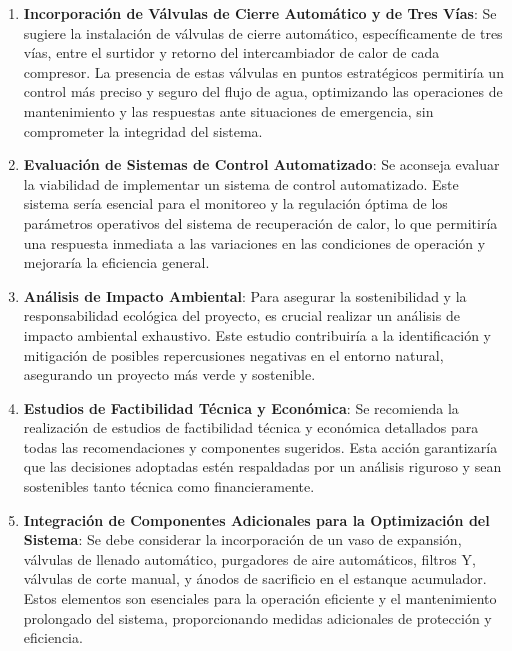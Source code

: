 \documentclass[11pt,a4paper]{article}  %
\begin{document}
\begin{enumerate}
  \item \textbf{Incorporación de Válvulas de Cierre Automático y de Tres Vías}: Se sugiere la instalación de válvulas de cierre automático, específicamente de tres vías, entre el surtidor y retorno del intercambiador de calor de cada compresor. La presencia de estas válvulas en puntos estratégicos permitiría un control más preciso y seguro del flujo de agua, optimizando las operaciones de mantenimiento y las respuestas ante situaciones de emergencia, sin comprometer la integridad del sistema.

\item \textbf{Evaluación de Sistemas de Control Automatizado}: Se aconseja evaluar la viabilidad de implementar un sistema de control automatizado. Este sistema sería esencial para el monitoreo y la regulación óptima de los parámetros operativos del sistema de recuperación de calor, lo que permitiría una respuesta inmediata a las variaciones en las condiciones de operación y mejoraría la eficiencia general.

\item \textbf{Análisis de Impacto Ambiental}: Para asegurar la sostenibilidad y la responsabilidad ecológica del proyecto, es crucial realizar un análisis de impacto ambiental exhaustivo. Este estudio contribuiría a la identificación y mitigación de posibles repercusiones negativas en el entorno natural, asegurando un proyecto más verde y sostenible.

\item \textbf{Estudios de Factibilidad Técnica y Económica}: Se recomienda la realización de estudios de factibilidad técnica y económica detallados para todas las recomendaciones y componentes sugeridos. Esta acción garantizaría que las decisiones adoptadas estén respaldadas por un análisis riguroso y sean sostenibles tanto técnica como financieramente.

\item \textbf{Integración de Componentes Adicionales para la Optimización del Sistema}: Se debe considerar la incorporación de un vaso de expansión, válvulas de llenado automático, purgadores de aire automáticos, filtros Y, válvulas de corte manual, y ánodos de sacrificio en el estanque acumulador. Estos elementos son esenciales para la operación eficiente y el mantenimiento prolongado del sistema, proporcionando medidas adicionales de protección y eficiencia.
\end{enumerate}
\end{document}
